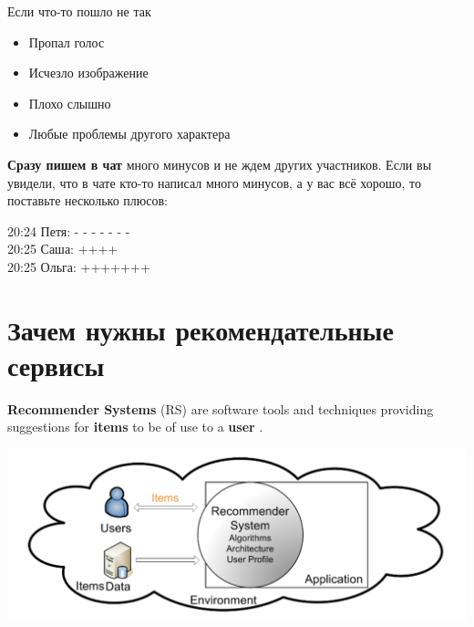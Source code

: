 \documentclass[11pt,aspectratio=169,handout]{beamer}
\begin{document}
\begin{frame}{Если что-то пошло не так}

\begin{itemize}
\item Пропал голос
\item Исчезло изображение
\item Плохо слышно
\item Любые проблемы другого характера
\end{itemize}
\vfill
{\bf Сразу пишем в чат} много минусов и не ждем других участников. Если вы увидели, что в чате кто-то написал много минусов, а у вас всё хорошо, то поставьте несколько плюсов:
\vfill
\begin{tcolorbox}[colback=gray!5,colframe=gray!80,title=]
20:24 Петя: - - - - - - -  \\
20:25 Саша: ++++ \\
20:25 Ольга: +++++++
\end{tcolorbox}

\end{frame}

\section{Зачем нужны рекомендательные сервисы}

\begin{frame}{}

\vfill
\begin{tcolorbox}[colback=info!5,colframe=info!80,title=]
{\bf Recommender Systems} (RS) are software tools and techniques providing suggestions for {\bf items} to be of use to a {\bf user} \cite{RSHB}.
\end{tcolorbox}
\vfill
\begin{center}
\includegraphics[scale=0.3]{images/overall.png}
\end{center}

\end{frame}

{
\begin{frame}[plain]
\end{frame}
}
\end{document}
